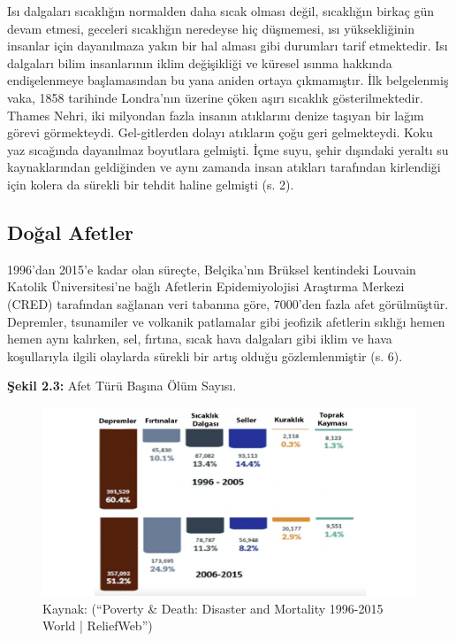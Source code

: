 \documentclass[
]{book}
\begin{document}
Isı dalgaları sıcaklığın normalden daha sıcak olması değil, sıcaklığın birkaç gün devam etmesi, geceleri sıcaklığın neredeyse hiç düşmemesi, ısı yüksekliğinin insanlar için dayanılmaza yakın bir hal alması gibi durumları tarif etmektedir. Isı dalgaları bilim insanlarının iklim değişikliği ve küresel ısınma hakkında endişelenmeye başlamasından bu yana aniden ortaya çıkmamıştır. İlk belgelenmiş vaka, 1858 tarihinde Londra'nın üzerine çöken aşırı sıcaklık gösterilmektedir. Thames Nehri, iki milyondan fazla insanın atıklarını denize taşıyan bir lağım görevi görmekteydi. Gel-gitlerden dolayı atıkların çoğu geri gelmekteydi. Koku yaz sıcağında dayanılmaz boyutlara gelmişti. İçme suyu, şehir dışındaki yeraltı su kaynaklarından geldiğinden ve aynı zamanda insan atıkları tarafından kirlendiği için kolera da sürekli bir tehdit haline gelmişti (s. 2). \citep{bush2020}

\hypertarget{doux11fal-afetler}{%
\subsection{Doğal Afetler}\label{doux11fal-afetler}}

1996'dan 2015'e kadar olan süreçte, Belçika'nın Brüksel kentindeki Louvain Katolik Üniversitesi'ne bağlı Afetlerin Epidemiyolojisi Araştırma Merkezi (CRED) tarafından sağlanan veri tabanına göre, 7000'den fazla afet görülmüştür. Depremler, tsunamiler ve volkanik patlamalar gibi jeofizik afetlerin sıklığı hemen hemen aynı kalırken, sel, fırtına, sıcak hava dalgaları gibi iklim ve hava koşullarıyla ilgili olaylarda sürekli bir artış olduğu gözlemlenmiştir (s. 6). \citep{bush2020}

\textbf{Şekil 2.3:} Afet Türü Başına Ölüm Sayısı.

\begin{figure}
\includegraphics[width=0.95\linewidth,height=0.95\textheight]{tablolar-sekiller/sekil-2-3} \caption{Kaynak: (“Poverty & Death: Disaster and Mortality 1996-2015 World | ReliefWeb”)}\label{fig:unnamed-chunk-4}
\end{figure}
\end{document}

